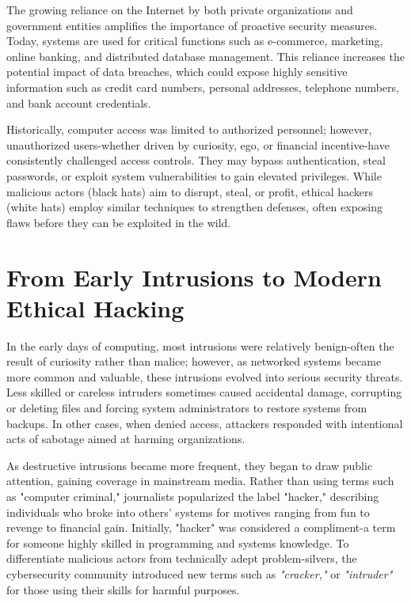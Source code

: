 The growing reliance on the Internet by both private organizations and government entities amplifies the importance of proactive security measures. Today, systems are used for critical functions such as e-commerce, marketing, online banking, and distributed database management. This reliance increases the potential impact of data breaches, which could expose highly sensitive information such as credit card numbers, personal addresses, telephone numbers, and bank account credentials.

Historically, computer access was limited to authorized personnel; however, unauthorized users-whether driven by curiosity, ego, or financial incentive-have consistently challenged access controls. They may bypass authentication, steal passwords, or exploit system vulnerabilities to gain elevated privileges. While malicious actors (black hats) aim to disrupt, steal, or profit, ethical hackers (white hats) employ similar techniques to strengthen defenses, often exposing flaws before they can be exploited in the wild.

\section{From Early Intrusions to Modern Ethical Hacking}
In the early days of computing, most intrusions were relatively benign-often the result of curiosity rather than malice; however, as networked systems became more common and valuable, these intrusions evolved into serious security threats. Less skilled or careless intruders sometimes caused accidental damage, corrupting or deleting files and forcing system administrators to restore systems from backups. In other cases, when denied access, attackers responded with intentional acts of sabotage aimed at harming organizations.

As destructive intrusions became more frequent, they began to draw public attention, gaining coverage in mainstream media. Rather than using terms such as "computer criminal," journalists popularized the label "hacker," describing individuals who broke into others' systems for motives ranging from fun to revenge to financial gain. Initially, "hacker" was considered a compliment-a term for someone highly skilled in programming and systems knowledge. To differentiate malicious actors from technically adept problem-silvers, the cybersecurity community introduced new terms such as \textit{"cracker,"} or \textit{"intruder"} for those using their skills for harmful purposes.

